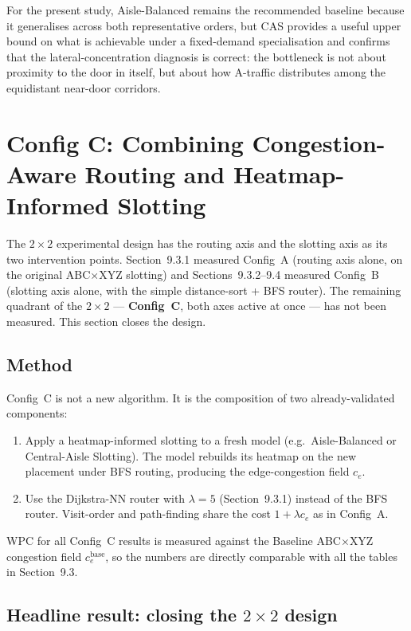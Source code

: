\documentclass[12pt,a4paper]{article}
\begin{document}
For the present study, Aisle-Balanced remains the recommended baseline
because it generalises across both representative orders, but CAS provides
a useful upper bound on what is achievable under a fixed-demand
specialisation and confirms that the lateral-concentration diagnosis is
correct: the bottleneck is not about proximity to the door in itself, but
about how A-traffic distributes among the equidistant near-door corridors.

\section{Config C: Combining Congestion-Aware Routing and Heatmap-Informed Slotting}

The $2\times2$ experimental design has the routing axis and the slotting
axis as its two intervention points.
Section~9.3.1 measured Config~A (routing axis alone, on the original
ABC$\times$XYZ slotting) and Sections~9.3.2--9.4 measured Config~B (slotting
axis alone, with the simple distance-sort + BFS router).
The remaining quadrant of the $2\times2$ --- \textbf{Config~C}, both axes
active at once --- has not been measured.
This section closes the design.

\subsection{Method}

Config~C is not a new algorithm.
It is the composition of two already-validated components:
\begin{enumerate}
  \item Apply a heatmap-informed slotting to a fresh model
        (e.g.\ Aisle-Balanced or Central-Aisle Slotting).
        The model rebuilds its heatmap on the new placement under BFS
        routing, producing the edge-congestion field $c_e$.
  \item Use the Dijkstra-NN router with $\lambda = 5$ (Section~9.3.1)
        instead of the BFS router.
        Visit-order and path-finding share the cost
        $1 + \lambda c_e$ as in Config~A.
\end{enumerate}
WPC for all Config~C results is measured against the Baseline
ABC$\times$XYZ congestion field $c_e^{\text{base}}$, so the numbers are
directly comparable with all the tables in Section~9.3.

\subsection{Headline result: closing the $2\times2$ design}
\end{document}
